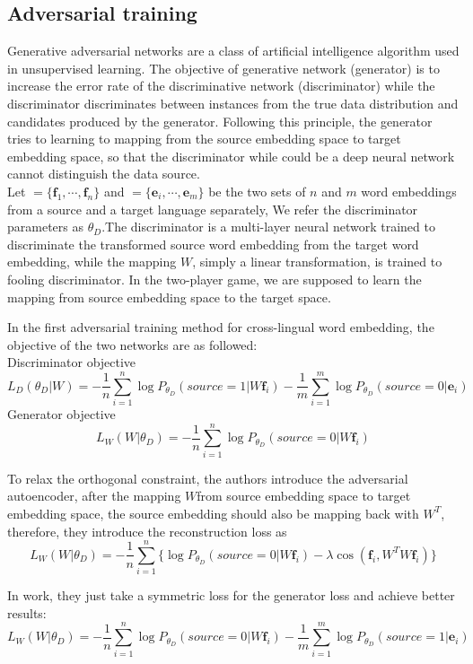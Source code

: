 \subsection{Adversarial training}
Generative adversarial networks are a class of artificial intelligence algorithm used in unsupervised learning. The objective of generative network (generator) is to increase the error rate of the discriminative network (discriminator) while the discriminator discriminates between instances from the true data distribution and candidates produced by the generator. 
Following this principle, the generator tries to learning to mapping from the source embedding space to target embedding space, so that the discriminator while could be a deep neural network cannot distinguish the data source. \\
Let ${=\{ \bm{f}_1, \cdots, \bm{f}_n\}}$ and ${ = \{ \bm{e}_i, \cdots , \bm{e}_m\}}$ be the two sets of $n$ and $m$ word embeddings from a source and a target language separately, We refer the discriminator parameters as ${\theta_D}$.The discriminator is a multi-layer neural network trained to discriminate the transformed source word embedding from the target word embedding, while the mapping $W$, simply a linear transformation, is trained to fooling discriminator. In the two-player game, we are supposed to learn the mapping from source embedding space to the target space.

In the first adversarial training method for cross-lingual word embedding, the objective of the two networks are as followed:\\
Discriminator objective  
\[ L_D(\theta_D | W) =  -\frac{1}{n} \sum_{i=1}^{n} \log P_{\theta_D}(source = 1| W\bm{f}_i) - \frac{1}{m} \sum_{i=1}^{m} \log P_{\theta_D}(source=0| \bm{e}_i) \]	
Generator objective 
\[ L_W(W|\theta_D) =  -\frac{1}{n} \sum_{i=1}^{n}\log P_{\theta_D}(source=0|W \bm{f}_i)  \]

To relax the orthogonal constraint, the authors introduce the adversarial autoencoder, after the mapping $W $from source embedding space to target embedding space, the source embedding should also be mapping back with $W^T$, therefore, they introduce the reconstruction loss as 
\[ L_W(W|\theta_D) =  -\frac{1}{n} \sum_{i=1}^{n} \{\log P_{\theta_D}(source=0|W \bm{f}_i) -  \lambda \cos (\bm{f}_i, W^T W \bm{f}_i)\}\]

In \cite{conneau2017word} work, they just take a symmetric loss for the generator loss and achieve better results:
\[ L_W(W|\theta_D) =  -\frac{1}{n} \sum_{i=1}^{n}\log P_{\theta_D}(source=0|W \bm{f}_i) - \frac{1}{m} \sum_{i=1}^{m} \log P_{\theta_D}(source = 1 | \bm{e}_i) \]





